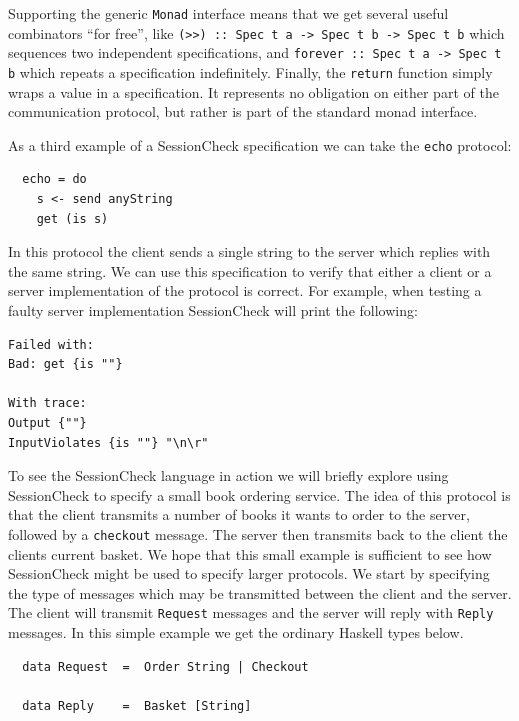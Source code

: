 \documentclass{article}
\begin{document}
%
Supporting the generic \texttt{Monad} interface means that we get several useful combinators ``for free'', like
\texttt{(>>) :: Spec t a -> Spec t b -> Spec t b} which sequences two independent specifications, and
\texttt{forever :: Spec t a -> Spec t b} which repeats a specification indefinitely.
%
Finally, the \texttt{return} function simply wraps a value in a specification.
%
It represents no obligation on either part of the communication protocol, but rather is part of the standard
monad interface.
%

As a third example of a SessionCheck specification we can take the \texttt{echo} protocol:
%
\begin{verbatim}
  echo = do
    s <- send anyString
    get (is s)
\end{verbatim}
%
In this protocol the client sends a single string to the server which
replies with the same string.
%
We can use this specification to verify that either a client or a server implementation of
the protocol is correct.
%
For example, when testing a faulty server implementation SessionCheck will print the following:
%
\begin{verbatim}
Failed with:
Bad: get {is ""}

With trace:
Output {""}
InputViolates {is ""} "\n\r"
\end{verbatim}

To see the SessionCheck language in action we will briefly explore
using SessionCheck to specify a small book ordering service.
%
The idea of this protocol is that the client transmits a number of
books it wants to order to the server, followed by a
\texttt{checkout} message.
%
The server then transmits back to the client the clients current
basket.
%
We hope that this small example is sufficient to see how SessionCheck
might be used to specify larger protocols.
%
We start by specifying the type of messages which may be transmitted
between the client and the server.
%
The client will transmit \texttt{Request} messages and
the server will reply with \texttt{Reply} messages.
%
In this simple example we get the ordinary Haskell types below.
%
\begin{verbatim}
  data Request  =  Order String | Checkout

  data Reply    =  Basket [String]
\end{verbatim}
\end{document}
